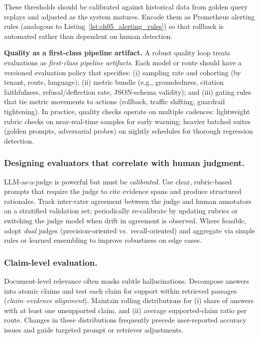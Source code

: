 These thresholds should be calibrated against historical data from golden query replays and adjusted as the system matures. Encode them as Prometheus alerting rules (analogous to Listing~\ref{lst:ch05_alerting_rules}) so that rollback is automated rather than dependent on human detection.

\medskip
\noindent\textbf{Quality as a first-class pipeline artifact.}
A robust quality loop treats evaluations as \emph{first-class pipeline artifacts}. Each model or route should have a versioned evaluation policy that specifies: (i) sampling rate and cohorting (by tenant, route, language); (ii) metric bundle (e.g., groundedness, citation faithfulness, refusal/deflection rate, JSON-schema validity); and (iii) gating rules that tie metric movements to actions (rollback, traffic shifting, guardrail tightening). In practice, quality checks operate on multiple cadences: lightweight rubric checks on near-real-time samples for early warning; heavier batched suites (golden prompts, adversarial probes) on nightly schedules for thorough regression detection.

\subsubsection{Designing evaluators that correlate with human judgment.}
LLM-as-a-judge is powerful but must be \emph{calibrated}. Use clear, rubric-based prompts that require the judge to cite evidence spans and produce structured rationales. Track inter-rater agreement between the judge and human annotators on a stratified validation set; periodically re-calibrate by updating rubrics or switching the judge model when drift in agreement is observed. Where feasible, adopt \emph{dual} judges (precision-oriented vs.\ recall-oriented) and aggregate via simple rules or learned ensembling to improve robustness on edge cases.

\subsubsection{Claim-level evaluation.}
Document-level relevance often masks subtle hallucinations. Decompose answers into atomic claims and test each claim for support within retrieved passages (\emph{claim–evidence alignment}). Maintain rolling distributions for (i) share of answers with at least one unsupported claim, and (ii) average supported-claim ratio per route. Changes in these distributions frequently precede user-reported accuracy issues and guide targeted prompt or retriever adjustments.

